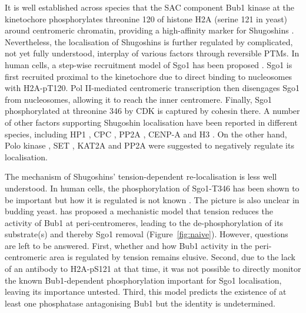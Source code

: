 It is well established across species that the SAC component Bub1 kinase at the kinetochore phosphorylates threonine 120 of histone H2A (serine 121 in yeast) around centromeric chromatin, providing a high-affinity marker for Shugoshins \citep{Rivera2012, Boyarchuk2007Bub1Centromere, Williams2017Bub1Kinetochores, Kitajima2005, Perera2010, Tang2004, Fernius2007Bub1Mitosis, Kiburz2005, Kawashima2010a}. Nevertheless, the localisation of Shugoshins is further regulated by complicated, not yet fully understood, interplay of various factors through reversible PTMs. In human cells, a step-wise recruitment model of Sgo1 has been proposed \citep{Liu2013, Liu2013a, Liu2015}. Sgo1 is first recruited proximal to the kinetochore due to direct binding to nucleosomes with H2A-pT120. Pol II-mediated centromeric transcription then disengages Sgo1 from nucleosomes, allowing it to reach the inner centromere. Finally, Sgo1 phosphorylated at threonine 346 by CDK is captured by cohesin there. A number of other factors supporting Shugoshin localisation have been reported in different species, including HP1 \citep{Yamagishi2008, Kang2011, Perera2010}, CPC \citep{Huang2007, Tanno2010, Rivera2012, Kawashima2007, Boyarchuk2007Bub1Centromere, Resnick2006INCENPDrosophila}, PP2A \citep{Tang2006a}, CENP-A \citep{Petty2018ConnectingCheckpoint, Eot-Houllier2018AuroraFatigue, Mishra2018BuddingChromatin} and H3 \citep{Buehl2018a, Luo2016}. On the other hand, Polo kinase \citep{Clarke2005}, SET \citep{Qu2019SETSegregation, Krishnan2017Phospho-H1Mitosis}, KAT2A \citep{Petty2018ConnectingCheckpoint} and PP2A \citep{Nerusheva2014} were suggested to negatively regulate its localisation. 

The mechanism of Shugoshins' tension-dependent re-localisation is less well understood. In human cells, the phosphorylation of Sgo1-T346 has been shown to be important but how it is regulated is not known \citep{Liu2013, Liu2015}. The picture is also unclear in budding yeast. \cite{Nerusheva2014} has proposed a mechanistic model that tension reduces the activity of Bub1 at peri-centromeres, leading to the de-phosphorylation of its substrate(s) and thereby Sgo1 removal (Figure~\ref{fig:naive}). However, questions are left to be answered. First, whether and how Bub1 activity in the peri-centromeric area is regulated by tension remains elusive. Second, due to the lack of an antibody to H2A-pS121 at that time, it was not possible to directly monitor the known Bub1-dependent phosphorylation important for Sgo1 localisation, leaving its importance untested. Third, this model predicts the existence of at least one phosphatase antagonising Bub1 but the identity is undetermined. 

